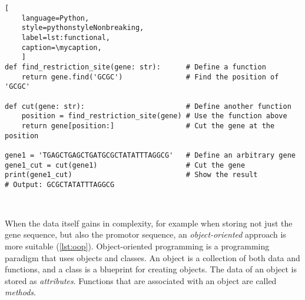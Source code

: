 \def\mycaption{ Example of functional programming in Python. The code
    defines a function called ``\texttt{find\_restriction\_site}'' that
    finds the position of a restriction site in a gene. The function
    ``\texttt{cut}'' uses the function ``\texttt{find\_restriction\_site}''
    to cut the gene at the restriction site.}
\begin{lstlisting}[
    language=Python,
    style=pythonstyleNonbreaking,
    label=lst:functional,
    caption=\mycaption,
    ]
def find_restriction_site(gene: str):      # Define a function
    return gene.find('GCGC')               # Find the position of 'GCGC'
    
def cut(gene: str):                        # Define another function
    position = find_restriction_site(gene) # Use the function above
    return gene[position:]                 # Cut the gene at the position
    
gene1 = 'TGAGCTGAGCTGATGCGCTATATTTAGGCG'   # Define an arbitrary gene
gene1_cut = cut(gene1)                     # Cut the gene
print(gene1_cut)                           # Show the result
# Output: GCGCTATATTTAGGCG
    
    
\end{lstlisting}


When the data itself gains in complexity, for example when storing not just the
gene sequence, but also the promotor sequence, an \emph{object-oriented} approach is
more suitable (\autoref{lst:oop}). Object-oriented programming is a programming
paradigm that uses objects and classes. An object is a collection of both data
and functions, and a class is a blueprint for creating objects. The data of an
object is stored as \emph{attributes}. Functions that are associated with an object are
called \emph{methods}.


